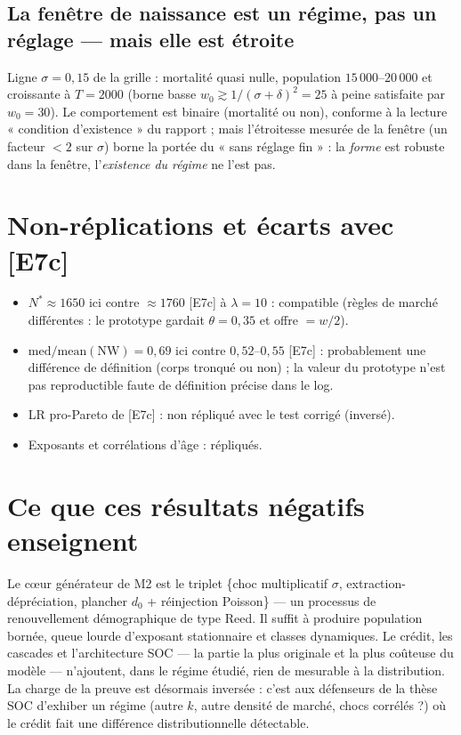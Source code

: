 \documentclass[11pt,a4paper]{article}
\newcommand{\NW}{\mathrm{NW}}
\begin{document}
\subsection{La fenêtre de naissance est un régime, pas un réglage — mais
elle est étroite}
Ligne $\sigma = 0{,}15$ de la grille : mortalité quasi nulle, population
$15\,000$--$20\,000$ et croissante à $T=2000$ (borne basse
$w_0 \gtrsim 1/(\sigma+\delta)^2 = 25$ à peine satisfaite par $w_0 = 30$).
Le comportement est binaire (mortalité ou non), conforme à la lecture
« condition d'existence » du rapport ; mais l'étroitesse mesurée de la
fenêtre (un facteur $< 2$ sur $\sigma$) borne la portée du « sans réglage
fin » : la \emph{forme} est robuste dans la fenêtre, l'\emph{existence du
régime} ne l'est pas.

\section{Non-réplications et écarts avec [E7c]}
\begin{itemize}[nosep]
\item $N^* \approx 1650$ ici contre $\approx 1760$ [E7c] à $\lambda = 10$ :
  compatible (règles de marché différentes : le prototype gardait
  $\theta = 0{,}35$ et offre $= w/2$).
\item $\mathrm{med}/\mathrm{mean}(\NW) = 0{,}69$ ici contre $0{,}52$--$0{,}55$
  [E7c] : probablement une différence de définition (corps tronqué ou non) ;
  la valeur du prototype n'est pas reproductible faute de définition
  précise dans le log.
\item LR pro-Pareto de [E7c] : non répliqué avec le test corrigé (inversé).
\item Exposants et corrélations d'âge : répliqués.
\end{itemize}

\section{Ce que ces résultats négatifs enseignent}
Le cœur générateur de M2 est le triplet \{choc multiplicatif $\sigma$,
extraction-dépréciation, plancher $d_0$ + réinjection Poisson\} — un
processus de renouvellement démographique de type Reed. Il suffit à produire
population bornée, queue lourde d'exposant stationnaire et classes
dynamiques. Le crédit, les cascades et l'architecture SOC — la partie la
plus originale et la plus coûteuse du modèle — n'ajoutent, dans le régime
étudié, rien de mesurable à la distribution. La charge de la preuve est
désormais inversée : c'est aux défenseurs de la thèse SOC d'exhiber un
régime (autre $k$, autre densité de marché, chocs corrélés ?) où le crédit
fait une différence distributionnelle détectable.
\end{document}
